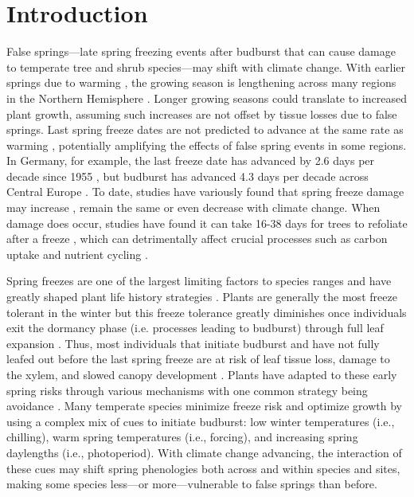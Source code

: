 \documentclass{article}\usepackage[]{graphicx}\usepackage[]{color}
\newcommand{\R}[1]{\label{#1}\linelabel{#1}}
\begin{document}
\section*{Introduction} %
False springs---late spring freezing events after budburst that can cause damage to temperate tree and shrub species---may shift with climate change. With earlier springs due to warming \citep{Wolkovich2012,IPCC2014}, the growing season is lengthening across many regions in the Northern Hemisphere \citep{Chen2005,Liu2006, Kukal2018}. Longer growing seasons could translate to increased plant growth, assuming such increases are not offset by tissue losses due to false springs. Last spring freeze dates are not predicted to advance at the same rate as warming \citep{Inouye2008,Martin2010,Labe2016,Wypych2016a,Sgubin2018}, potentially amplifying the effects of false spring events in some regions. \R{Zbbrefbegin} In Germany, for example, the last freeze date has advanced by 2.6 days per decade since 1955 \citep{Zohner2016}, but budburst has advanced 4.3 days per decade across Central Europe \citep{Fu2014,Vitasse2018}\R{Zbbrefend}. To date, studies have variously found that spring freeze damage may increase \citep{Hannenin1991,Augspurger2013,Labe2016}, remain the same \citep{Scheifinger2003} or even decrease \citep{Kramer1994, Vitra2017} with climate change. When damage does occur, studies have found it can take 16-38 days for trees to refoliate after a freeze \citep{Gu2008,Augspurger2009, Augspurger2013, Menzel2015}, which can detrimentally affect crucial processes such as carbon uptake and nutrient cycling \citep{Hufkens2012,Richardson2013,Klosterman2018}.  

Spring freezes are one of the largest limiting factors to species ranges and have greatly shaped plant life history strategies \citep{Kollas2014}. Plants are generally the most freeze tolerant in the winter but this freeze tolerance greatly diminishes once individuals exit the dormancy phase (i.e. processes leading to budburst) through full leaf expansion \citep{Vitasse2014,Lenz2016}. Thus, most individuals that initiate budburst and have not fully leafed out before the last spring freeze are at risk of leaf tissue loss, damage to the xylem, and slowed canopy development \citep{Gu2008,Hufkens2012}. Plants have adapted to these early spring risks through various mechanisms with one common strategy being avoidance \citep{Vitasse2014}. Many temperate species minimize freeze risk and optimize growth by using a complex mix of cues to initiate budburst: low winter temperatures (i.e., chilling), warm spring temperatures (i.e., forcing), and increasing spring daylengths (i.e., photoperiod). With climate change advancing, the interaction of these cues may shift spring phenologies both across and within species and sites, making some species less---or more---vulnerable to false springs than before.
\end{document}
